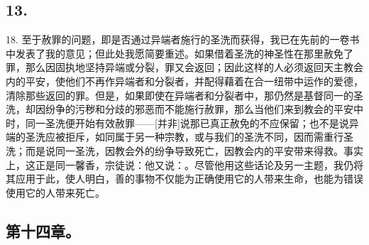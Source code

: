 
\subsection{13.}

18. 至于赦罪的问题，即是否通过异端者施行的圣洗而获得，我已在先前的一卷书中发表了我的意见；但此处我愿简要重述。如果借着圣洗的神圣性在那里赦免了罪，那么因固执地坚持异端或分裂，罪又会返回；因此这样的人必须返回天主教会内的平安，使他们不再作异端者和分裂者，并配得藉着在合一纽带中运作的爱德，清除那些返回的罪。但是，如果即使在异端者和分裂者中，那仍然是基督同一的圣洗，却因纷争的污秽和分歧的邪恶而不能施行赦罪，那么当他们来到教会的平安中时，同一圣洗便开始有效赦罪——[并非]说那已真正赦免的不应保留；也不是说异端的圣洗应被拒斥，如同属于另一种宗教，或与我们的圣洗不同，因而需重行圣洗；而是说同一圣洗，因教会外的纷争导致死亡，因教会内的平安带来得救。事实上，这正是同一馨香，宗徒说：他又说：。尽管他用这些话论及另一主题，我仍将其应用于此，使人明白，善的事物不仅能为正确使用它的人带来生命，也能为错误使用它的人带来死亡。\par


\subsection{第十四章。}


